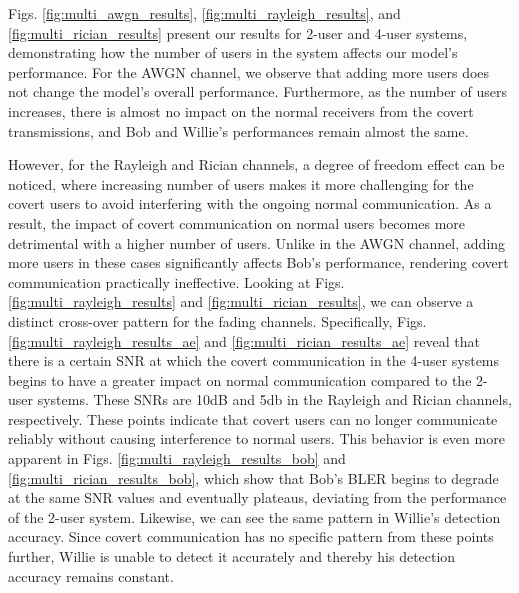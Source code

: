 Figs. \ref{fig:multi_awgn_results}, \ref{fig:multi_rayleigh_results}, and \ref{fig:multi_rician_results} present our results for 2-user and 4-user systems, demonstrating how the number of users in the system affects our model's performance. For the AWGN channel, we observe that adding more users does not change the model's overall performance. Furthermore, as the number of users increases, there is almost no impact on the normal receivers from the covert transmissions, and Bob and Willie's performances remain almost the same.

However, for the Rayleigh and Rician channels, a degree of freedom effect can be noticed, where increasing number of users makes it more challenging for the covert users to avoid interfering with the ongoing normal communication. As a result, the impact of covert communication on normal users becomes more detrimental with a higher number of users. Unlike in the AWGN channel, adding more users in these cases significantly affects Bob's performance, rendering covert communication practically ineffective. Looking at Figs. \ref{fig:multi_rayleigh_results} and \ref{fig:multi_rician_results}, we can observe a distinct cross-over pattern for the fading channels. Specifically, Figs. \ref{fig:multi_rayleigh_results_ae} and \ref{fig:multi_rician_results_ae} reveal that there is a certain SNR at which the covert communication in the 4-user systems begins to have a greater impact on normal communication compared to the 2-user systems. These SNRs are 10dB and 5db in the Rayleigh and Rician channels, respectively. These points indicate that covert users can no longer communicate reliably without causing interference to normal users. This behavior is even more apparent in Figs. \ref{fig:multi_rayleigh_results_bob} and \ref{fig:multi_rician_results_bob}, which show that Bob's BLER begins to degrade at the same SNR values and eventually plateaus, deviating from the performance of the 2-user system. Likewise, we can see the same pattern in Willie's detection accuracy. Since covert communication has no specific pattern from these points further, Willie is unable to detect it accurately and thereby his detection accuracy remains constant.


